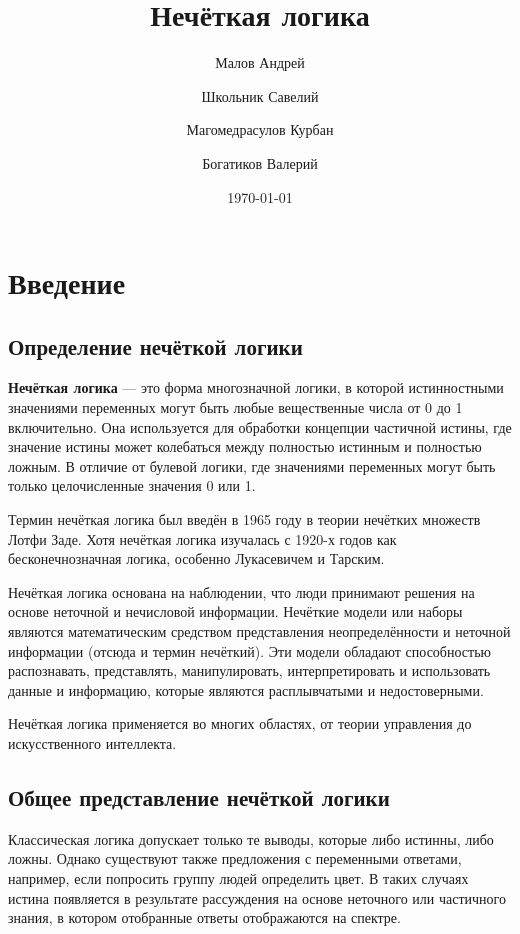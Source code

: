 \documentclass[a4paper,12pt]{report}
\author{
	Малов Андрей\\
	\and
	Школьник Савелий\\
	\and
	Магомедрасулов Курбан\\
	\and
	Богатиков Валерий\\
}
\title{Нечёткая логика}
\date{\today}
\begin{document}
	
\maketitle

\tableofcontents

\chapter{Введение}

\section{Определение нечёткой логики}

\textbf{Нечёткая логика} --- это форма многозначной логики, в которой истинностными значениями переменных могут быть любые вещественные числа от 0 до 1 включительно. Она используется для обработки концепции частичной истины, где значение истины может колебаться между полностью истинным и полностью ложным. В отличие от булевой логики, где значениями переменных могут быть только целочисленные значения 0 или 1.

Термин нечёткая логика был введён в 1965 году в теории нечётких множеств Лотфи Заде. Хотя нечёткая логика изучалась с 1920-х годов как бесконечнозначная логика, особенно Лукасевичем и Тарским.

Нечёткая логика основана на наблюдении, что люди принимают решения на основе неточной и нечисловой информации. Нечёткие модели или наборы являются математическим средством представления неопределённости и неточной информации (отсюда и термин нечёткий). Эти модели обладают способностью распознавать, представлять, манипулировать, интерпретировать и использовать данные и информацию, которые являются расплывчатыми и недостоверными.

Нечёткая логика применяется во многих областях, от теории управления до искусственного интеллекта.

\section{Общее представление нечёткой логики}
Классическая логика допускает только те выводы, которые либо истинны, либо ложны. Однако существуют также предложения с переменными ответами, например, если попросить группу людей определить цвет. В таких случаях истина появляется в результате рассуждения на основе неточного или частичного знания, в котором отобранные ответы отображаются на спектре.
\end{document}
